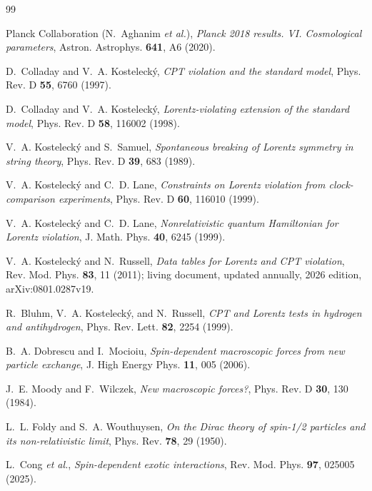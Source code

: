\documentclass[
  aps,
  prd,
  reprint,
  amsmath,
  amssymb,
  nofootinbib,
  superscriptaddress,
  floatfix
]{revtex4-2}
\begin{document}
\begin{thebibliography}{99}

Planck Collaboration (N.~Aghanim \textit{et al.}),
\textit{Planck 2018 results. VI. Cosmological parameters},
Astron. Astrophys. \textbf{641}, A6 (2020).

D.~Colladay and V.~A. Kostelecký,
\textit{CPT violation and the standard model},
Phys. Rev. D \textbf{55}, 6760 (1997).

D.~Colladay and V.~A. Kostelecký,
\textit{Lorentz-violating extension of the standard model},
Phys. Rev. D \textbf{58}, 116002 (1998).

V.~A. Kostelecký and S.~Samuel,
\textit{Spontaneous breaking of Lorentz symmetry in string theory},
Phys. Rev. D \textbf{39}, 683 (1989).

V.~A. Kostelecký and C.~D. Lane,
\textit{Constraints on Lorentz violation from clock-comparison
experiments},
Phys. Rev. D \textbf{60}, 116010 (1999).

V.~A. Kostelecký and C.~D. Lane,
\textit{Nonrelativistic quantum Hamiltonian for Lorentz violation},
J. Math. Phys. \textbf{40}, 6245 (1999).

V.~A. Kostelecký and N.~Russell,
\textit{Data tables for Lorentz and CPT violation},
Rev. Mod. Phys. \textbf{83}, 11 (2011); living document, updated
annually, 2026 edition, arXiv:0801.0287v19.

R.~Bluhm, V.~A. Kostelecký, and N.~Russell,
\textit{CPT and Lorentz tests in hydrogen and antihydrogen},
Phys. Rev. Lett. \textbf{82}, 2254 (1999).

B.~A. Dobrescu and I.~Mocioiu,
\textit{Spin-dependent macroscopic forces from new particle exchange},
J. High Energy Phys. \textbf{11}, 005 (2006).

J.~E. Moody and F.~Wilczek,
\textit{New macroscopic forces?},
Phys. Rev. D \textbf{30}, 130 (1984).

L.~L. Foldy and S.~A. Wouthuysen,
\textit{On the Dirac theory of spin-1/2 particles and its
non-relativistic limit},
Phys. Rev. \textbf{78}, 29 (1950).

L.~Cong \textit{et al.},
\textit{Spin-dependent exotic interactions},
Rev. Mod. Phys. \textbf{97}, 025005 (2025).


\end{thebibliography}
\end{document}
